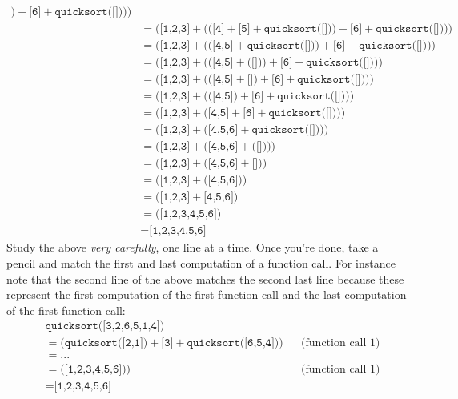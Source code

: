 \begin{align*}
       \bigr)
   + \texttt{[6]}
   + \texttt{quicksort([])}   
   \bigr)\bigr)
\\   
&= \bigl(
   \texttt{[1,2,3]}
   +
   \bigl( 
       \bigl(
       \texttt{[4]}
       + \texttt{[5]}
       + \texttt{quicksort([])}
       \bigr)
   + \texttt{[6]}
   + \texttt{quicksort([])}   
   \bigr)\bigr)
\\   
&= \bigl( 
   \texttt{[1,2,3]}
   +
   \bigl( 
       \bigl(
       \texttt{[4,5]}
       + \texttt{quicksort([])}
       \bigr)
   + \texttt{[6]}
   + \texttt{quicksort([])}   
   \bigr)\bigr)
\\   
&= \bigl(
   \texttt{[1,2,3]}
   +
   \bigl( 
       \bigl(
       \texttt{[4,5]}
       + \bigl(\texttt{[]}\bigr)
       \bigr)
   + \texttt{[6]}
   + \texttt{quicksort([])}   
   \bigr)\bigr)
\\   
&= \bigl(
   \texttt{[1,2,3]}
   +
   \bigl( 
       \bigl(
       \texttt{[4,5]}
       + \texttt{[]}
       \bigr)
   + \texttt{[6]}
   + \texttt{quicksort([])}   
   \bigr)\bigr)
\\   
&= \bigl(
   \texttt{[1,2,3]}
   +
   \bigl( 
       \bigl(
       \texttt{[4,5]}
       \bigr)
   + \texttt{[6]}
   + \texttt{quicksort([])}   
   \bigr)\bigr)
\\   
&= \bigl(\texttt{[1,2,3]}
   +
   \bigl( 
       \texttt{[4,5]}
   + \texttt{[6]}
   + \texttt{quicksort([])}   
   \bigr)\bigr)
\\   
&= \bigl(\texttt{[1,2,3]}
   +
   \bigl( 
       \texttt{[4,5,6]}
   + \texttt{quicksort([])}   
   \bigr)\bigr)
\\   
&= \bigl(\texttt{[1,2,3]}
   +
   \bigl( 
       \texttt{[4,5,6]}
   + \bigl( \texttt{[]} \bigr)   
   \bigr)\bigr)
\\
&= \bigl(
   \texttt{[1,2,3]}
   +
   \bigl( 
       \texttt{[4,5,6]}
   + \texttt{[]}   
   \bigr)\bigr)
\\   
&= \bigl(
   \texttt{[1,2,3]}
   +
   \bigl( 
       \texttt{[4,5,6]}
   \bigr)\bigr)
\\   
&= \bigl(
   \texttt{[1,2,3]}
   +
       \texttt{[4,5,6]}
   \bigr)
\\   
&= \bigl(
   \texttt{[1,2,3,4,5,6]}
   \bigr)
\\   
&= \texttt{[1,2,3,4,5,6]}
\end{align*}
Study the above \textit{very carefully}, one line at a time.
Once you're done, take a pencil and match the first and last computation
of a function call.
For instance note that the second line of the above matches the second last line because these represent the first computation of the first function call
and the last computation of the first function call:
\begin{align*}
&\texttt{quicksort([3,2,6,5,1,4])} 
\\
&= \bigl( 
   \texttt{quicksort([2,1])} + 
                \texttt{[3]} +
                \texttt{quicksort([6,5,4])} 
   \bigr) 
   & & \text{(function call 1)}
\\
&=  ...
\\   
&= \bigl(
   \texttt{[1,2,3,4,5,6])} 
   \bigr)
   & & \text{(function call 1)}
\\   
&= \texttt{[1,2,3,4,5,6]}
\end{align*}


